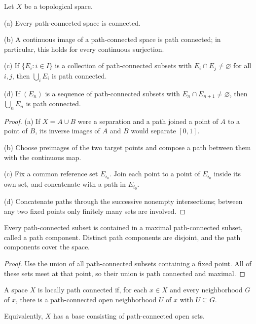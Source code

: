 \begin{thm}
Let $X$ be a topological space.

(a) Every path-connected space is connected.

(b) A continuous image of a path-connected space is path connected; in
particular, this holds for every continuous surjection.

(c) If $\{E_i:i\in I\}$ is a collection of path-connected subsets with
$E_i\cap E_j\neq\varnothing$ for all $i,j$, then $\bigcup_iE_i$ is path
connected.

(d) If $(E_n)$ is a sequence of path-connected subsets with
$E_n\cap E_{n+1}\neq\varnothing$, then $\bigcup_nE_n$ is path connected.
\end{thm}

\begin{proof}
(a) If $X=A\cup B$ were a separation and a path joined a point of $A$ to a
point of $B$, its inverse images of $A$ and $B$ would separate $[0,1]$.

(b) Choose preimages of the two target points and compose a path between them
with the continuous map.

(c) Fix a common reference set $E_{i_0}$. Join each point to a point of
$E_{i_0}$ inside its own set, and concatenate with a path in $E_{i_0}$.

(d) Concatenate paths through the successive nonempty intersections; between
any two fixed points only finitely many sets are involved.
\end{proof}

\begin{thm}
Every path-connected subset is contained in a maximal path-connected subset,
called a path component. Distinct path components are disjoint, and the path
components cover the space.
\end{thm}

\begin{proof}
Use the union of all path-connected subsets containing a fixed point. All of
these sets meet at that point, so their union is path connected and maximal.
\end{proof}

\begin{de}
A space $X$ is locally path connected if, for each $x\in X$ and every
neighborhood $G$ of $x$, there is a path-connected open neighborhood $U$ of
$x$ with $U\subseteq G$.
\end{de}

Equivalently, $X$ has a base consisting of path-connected open sets.

